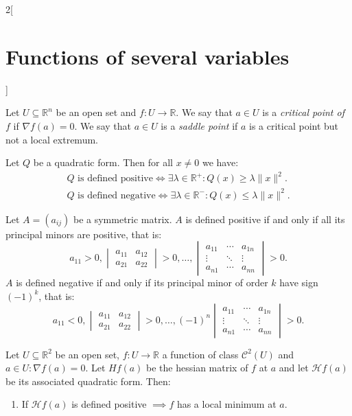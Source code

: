 \documentclass[class=article,10pt,crop=false]{standalone}
\begin{document}
\begin{multicols}{2}[\section{Functions of several variables}]
\begin{definition}
Let $U\subseteq\mathbb{R}^n$ be an open set and $f:U\rightarrow\mathbb{R}$. We say that $a\in U$ is a \textit{critical point of $f$} if $\nabla f(a)=0$. We say that $a\in U$ is a \textit{saddle point} if $a$ is a critical point but not a local extremum.
\end{definition}
\begin{theorem}
Let $Q$ be a quadratic form. Then for all $x\ne 0$ we have:
\begin{gather*}
    Q\text{ is defined positive}\iff\exists\lambda\in\mathbb{R}^+:Q(x)\geq\lambda\|x\|^2.\\
    Q\text{ is defined negative}\iff\exists\lambda\in\mathbb{R}^-:Q(x)\leq\lambda\|x\|^2.
\end{gather*}
\end{theorem}
\begin{prop}
Let $A=(a_{ij})$ be a symmetric matrix. $A$ is defined positive if and only if all its principal minors are positive, that is: $$a_{11}>0,\begin{vmatrix}
a_{11} & a_{12}\\
a_{21} & a_{22} \end{vmatrix}>0,\ldots,
\begin{vmatrix}
a_{11} &\cdots & a_{1n}\\
\vdots & \ddots & \vdots \\
a_{n1} & \cdots & a_{nn}
\end{vmatrix}>0.$$ $A$ is defined negative if and only if its principal minor of order $k$ have sign $(-1)^k$, that is: $$a_{11}<0,
\begin{vmatrix}
a_{11} & a_{12}\\
a_{21} & a_{22}
\end{vmatrix}>0,\ldots,
(-1)^n\begin{vmatrix}
a_{11} &\cdots & a_{1n}\\
\vdots & \ddots & \vdots \\
a_{n1} & \cdots & a_{nn}
\end{vmatrix}>0.$$
\end{prop}
\begin{theorem}
Let $U\subseteq\mathbb{R}^2$ be an open set, $f:U\rightarrow\mathbb{R}$ a function of class $\mathcal{C}^2(U)$ and $a\in U:\nabla f(a)=0$. Let $Hf(a)$ be the hessian matrix of $f$ at $a$ and let $\mathcal{H}f(a)$ be its associated quadratic form. Then:
\begin{enumerate}
    \item If $\mathcal{H}f(a)$ is defined positive $\implies f$ has a local minimum at $a$.

\end{enumerate}
\end{theorem}
\end{multicols}
\end{document}
